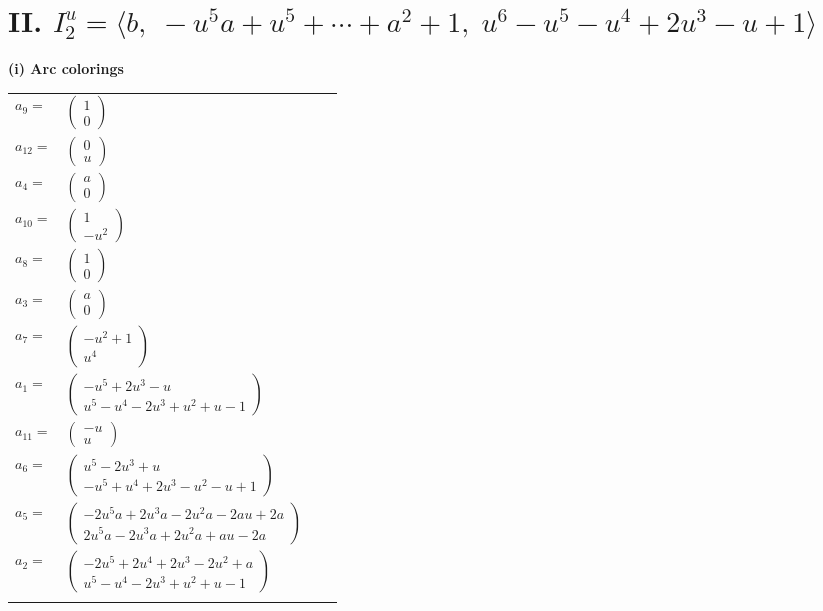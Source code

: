 \documentclass[1p]{elsarticle_modified}
\theoremstyle{definition}
\begin{document}
\centering \section*{II. $I^u_{2}= \langle b,\;- u^5 a+u^5+\cdots+a^2+1,\;u^6- u^5- u^4+2 u^3- u+1 \rangle$}
\flushleft \textbf{(i) Arc colorings}\\
\begin{tabular}{m{7pt} m{180pt} m{7pt} m{180pt} }
\flushright $a_{9}=$&$\begin{pmatrix}1\\0\end{pmatrix}$ \\
\flushright $a_{12}=$&$\begin{pmatrix}0\\u\end{pmatrix}$ \\
\flushright $a_{4}=$&$\begin{pmatrix}a\\0\end{pmatrix}$ \\
\flushright $a_{10}=$&$\begin{pmatrix}1\\- u^2\end{pmatrix}$ \\
\flushright $a_{8}=$&$\begin{pmatrix}1\\0\end{pmatrix}$ \\
\flushright $a_{3}=$&$\begin{pmatrix}a\\0\end{pmatrix}$ \\
\flushright $a_{7}=$&$\begin{pmatrix}- u^2+1\\u^4\end{pmatrix}$ \\
\flushright $a_{1}=$&$\begin{pmatrix}- u^5+2 u^3- u\\u^5- u^4-2 u^3+u^2+u-1\end{pmatrix}$ \\
\flushright $a_{11}=$&$\begin{pmatrix}- u\\u\end{pmatrix}$ \\
\flushright $a_{6}=$&$\begin{pmatrix}u^5-2 u^3+u\\- u^5+u^4+2 u^3- u^2- u+1\end{pmatrix}$ \\
\flushright $a_{5}=$&$\begin{pmatrix}-2 u^5 a+2 u^3 a-2 u^2 a-2 a u+2 a\\2 u^5 a-2 u^3 a+2 u^2 a+a u-2 a\end{pmatrix}$ \\
\flushright $a_{2}=$&$\begin{pmatrix}-2 u^5+2 u^4+2 u^3-2 u^2+a\\u^5- u^4-2 u^3+u^2+u-1\end{pmatrix}$\\&\end{tabular}
\end{document}
